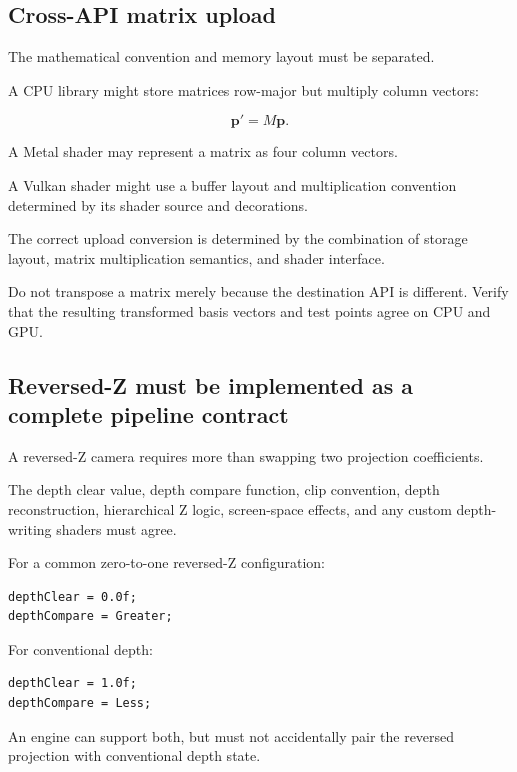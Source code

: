 \subsection{Cross-API matrix upload}\label{02-foundations-ii-ch037-cross-api-matrix-upload}

The mathematical convention and memory layout must be separated.

A CPU library might store matrices row-major but multiply column vectors:

\[ \mathbf p'=M\mathbf p. \]

A Metal shader may represent a matrix as four column vectors.

A Vulkan shader might use a buffer layout and multiplication convention determined by its shader source and decorations.

The correct upload conversion is determined by the combination of storage layout, matrix multiplication semantics, and shader interface.

Do not transpose a matrix merely because the destination API is different. Verify that the resulting transformed basis vectors and test points agree on CPU and GPU.

\subsection{Reversed-Z must be implemented as a complete pipeline contract}\label{02-foundations-ii-ch037-reversed-z-must-be-implemented-as-a-complete-pipeline-contract}

A reversed-Z camera requires more than swapping two projection coefficients.

The depth clear value, depth compare function, clip convention, depth reconstruction, hierarchical Z logic, screen-space effects, and any custom depth-writing shaders must agree.

For a common zero-to-one reversed-Z configuration:

\begin{verbatim}
depthClear = 0.0f;
depthCompare = Greater;
\end{verbatim}

For conventional depth:

\begin{verbatim}
depthClear = 1.0f;
depthCompare = Less;
\end{verbatim}

An engine can support both, but must not accidentally pair the reversed projection with conventional depth state.

